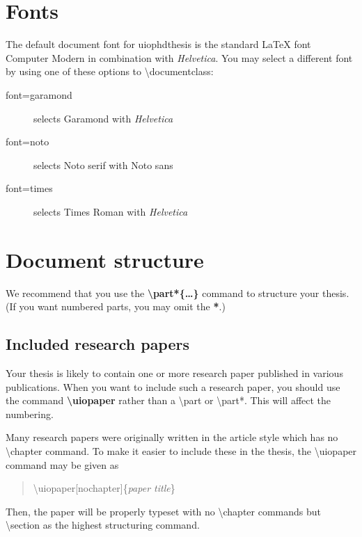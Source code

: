 \documentclass[UKenglish]{uiophdthesis}
\newcommand{\bsl}{\textbackslash}
\newcommand{\p}[1]{\textsf{#1}}
\newcommand{\pb}[1]{\textbf{\p{#1}}}
\newcommand{\pcmd}[1]{\p{\bsl #1}}
\newcommand{\ppar}[1]{\p{\{#1\}}}
\begin{document}
\section{Fonts\label{font}}
The default document font for \p{uiophdthesis} is the standard \LaTeX{} font
{\selectfont Computer Modern} in
combination with \textsf{\textit{Helvetica}}.
You may select a different font by using one of these
options to \pcmd{documentclass}:
\begin{description}
\item[\p{font=garamond}] selects
  {\selectfont Garamond} with
  \textsf{\textit{Helvetica}}
  
\item[\p{font=noto}] selects
  {\selectfont Noto serif} with
  {\selectfont Noto sans}

\item[\p{font=times}] selects
  {\selectfont Times Roman} with
  \textsf{\textit{Helvetica}}
\end{description}

\section{Document structure}
We recommend that you use the \textbf{\pcmd{part*}\ppar{\dots}}
command to structure your thesis. (If you want numbered parts, you may
omit the \pb{*}.)

\subsection{Included research papers}
Your thesis is likely to contain one or more research paper published
in various publications. When you want to include such a research
paper, you should use the command \textbf{\pcmd{uiopaper}} rather than
a \pcmd{part} or \pcmd{part*}. This will affect the numbering.

Many research papers were originally written in the \p{article} style
which has no \pcmd{chapter} command. To make it easier to include
these in the thesis, the \pcmd{uiopaper} command may be given as
\begin{quote}
  \p{\pcmd{uiopaper}[nochapter]\ppar{\emph{paper title}}}
\end{quote}
Then, the paper will be properly typeset with no \pcmd{chapter}
commands but \pcmd{section} as the highest structuring command.
\end{document}
